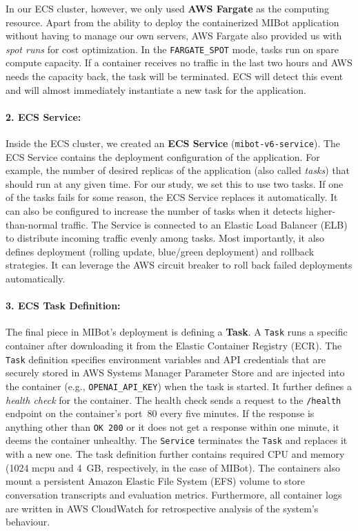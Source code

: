 In our ECS cluster, however, we only used \textbf{AWS Fargate} as the computing resource. Apart from the ability to deploy the containerized MIBot application without having to manage our own servers, AWS Fargate also provided us with \emph{spot runs} for cost optimization. In the \texttt{FARGATE\_SPOT} mode, tasks run on spare compute capacity. If a container receives no traffic in the last two hours and AWS needs the capacity back, the task will be terminated. ECS will detect this event and will almost immediately instantiate a new task for the application.

\paragraph{2. ECS Service:}Inside the ECS cluster, we created an \textbf{ECS Service} (\texttt{mibot-v6-service}). The ECS Service contains the deployment configuration of the application. For example, the number of desired replicas of the application (also called \emph{tasks}) that should run at any given time.  For our study, we set this to use two tasks. If one of the tasks fails for some reason, the ECS Service replaces it automatically. It can also be configured to increase the number of tasks when it detects higher-than-normal traffic. The Service is connected to an Elastic Load Balancer (ELB) to distribute incoming traffic evenly among tasks. Most importantly, it also defines deployment (rolling update, blue/green deployment) and rollback strategies. It can leverage the AWS circuit breaker to roll back failed deployments automatically.

\paragraph{3. ECS Task Definition:}The final piece in MIBot's deployment is defining a \textbf{Task}. A \texttt{Task} runs a specific container after downloading it from the Elastic Container Registry (ECR). The \texttt{Task} definition specifies environment variables and API credentials that are securely stored in AWS Systems Manager Parameter Store and are injected into the container (e.g., \texttt{OPENAI\_API\_KEY}) when the task is started. It further defines a \emph{health check} for the container. The health check sends a request to the \texttt{/health} endpoint on the container's port~80 every five minutes. If the response is anything other than \texttt{OK 200} or it does not get a response within one minute, it deems the container unhealthy. The \texttt{Service} terminates the \texttt{Task} and replaces it with a new one. The task definition further contains required CPU and memory (1024 mcpu and 4~GB, respectively, in the case of MIBot). The containers also mount a persistent Amazon Elastic File System (EFS) volume to store conversation transcripts and evaluation metrics. Furthermore, all container logs are written in AWS CloudWatch for retrospective analysis of the system's behaviour.

